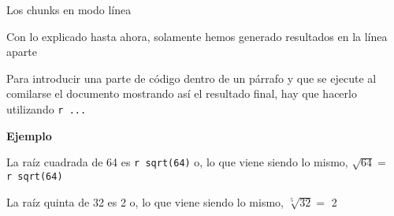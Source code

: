 \documentclass[
  ignorenonframetext,
]{beamer}
\begin{document}
\begin{frame}[fragile]{Los chunks en modo línea}
\protect\hypertarget{los-chunks-en-modo-luxednea-1}{}

Con lo explicado hasta ahora, solamente hemos generado resultados en la
línea aparte

Para introducir una parte de código dentro de un párrafo y que se
ejecute al comilarse el documento mostrando así el resultado final, hay
que hacerlo utilizando \texttt{\textasciigrave{}r\ ...\textasciigrave{}}

\textbf{Ejemplo}

La raíz cuadrada de 64 es
\texttt{\textasciigrave{}r\ sqrt(64)\textasciigrave{}} o, lo que viene
siendo lo mismo,
\(\sqrt{64}=\)\texttt{\textasciigrave{}r\ sqrt(64)\textasciigrave{}}

La raíz quinta de 32 es 2 o, lo que viene siendo lo mismo,
\(\sqrt[5]{32}=\) 2

\end{frame}
\end{document}

